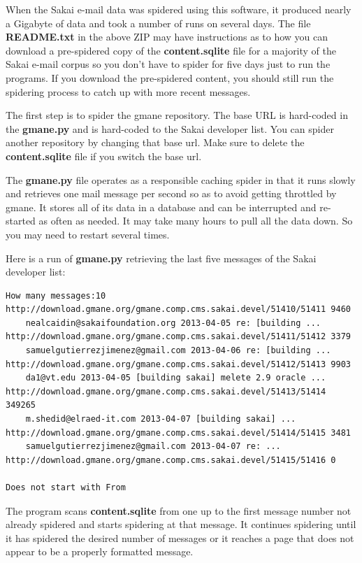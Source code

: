 \documentclass[11pt]{book}
\begin{document}
When the Sakai e-mail data was spidered using this software, it produced nearly 
a Gigabyte of data and took a number of runs on several days.
The file {\bf README.txt} in the above ZIP may have instructions as to how
you can download a pre-spidered copy of the {\bf content.sqlite} file for 
a majority of the Sakai e-mail corpus so you don't have to spider for 
five days just to run the programs.  If you download the pre-spidered
content, you should still run the spidering process to catch up with 
more recent messages.

The first step is to spider the gmane repository.  The base URL 
is hard-coded in the {\bf gmane.py} and is hard-coded to the Sakai
developer list.  You can spider another repository by changing that
base url.   Make sure to delete the {\bf content.sqlite} file if you 
switch the base url.  

The {\bf gmane.py} file operates as a responsible caching spider in 
that it runs slowly and retrieves one mail message per second so 
as to avoid getting throttled by gmane.   It stores all of
its data in a database and can be interrupted and re-started 
as often as needed.   It may take many hours to pull all the data
down.  So you may need to restart several times.

Here is a run of {\bf gmane.py} retrieving the last five messages of the
Sakai developer list:

\beforeverb
\begin{verbatim}
How many messages:10
http://download.gmane.org/gmane.comp.cms.sakai.devel/51410/51411 9460
    nealcaidin@sakaifoundation.org 2013-04-05 re: [building ...
http://download.gmane.org/gmane.comp.cms.sakai.devel/51411/51412 3379
    samuelgutierrezjimenez@gmail.com 2013-04-06 re: [building ...
http://download.gmane.org/gmane.comp.cms.sakai.devel/51412/51413 9903
    da1@vt.edu 2013-04-05 [building sakai] melete 2.9 oracle ...
http://download.gmane.org/gmane.comp.cms.sakai.devel/51413/51414 349265
    m.shedid@elraed-it.com 2013-04-07 [building sakai] ...
http://download.gmane.org/gmane.comp.cms.sakai.devel/51414/51415 3481
    samuelgutierrezjimenez@gmail.com 2013-04-07 re: ...
http://download.gmane.org/gmane.comp.cms.sakai.devel/51415/51416 0

Does not start with From 
\end{verbatim}
\afterverb
%
The program scans {\bf content.sqlite} from one up to the first message number not
already spidered and starts spidering at that message.  It continues spidering
until it has spidered the desired number of messages or it reaches a page
that does not appear to be a properly formatted message.
\end{document}

